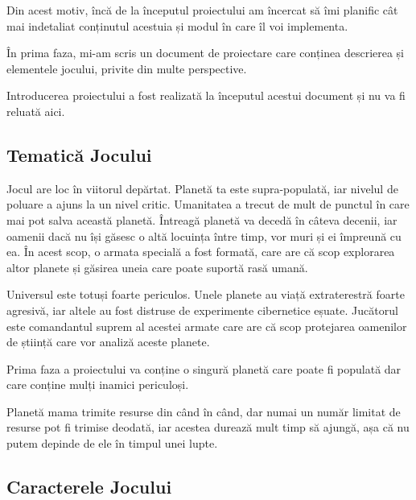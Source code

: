 \documentclass[12pt, a4paper]{article}
\begin{document}
	Din acest motiv, încă de la începutul proiectului am încercat să îmi planific cât mai indetaliat conținutul acestuia și modul în care îl voi implementa.
	\newline
	
	În prima faza, mi-am scris un document de proiectare care conținea descrierea și elementele jocului, privite din multe perspective.
	\newline
	
	Introducerea proiectului a fost realizată la începutul acestui document și nu va fi reluată aici.
	
	
	
	
	
	\subsection{Tematică Jocului}
	\label{section: gamePlot}
	
	Jocul are loc în viitorul depărtat. Planetă ta este supra-populată, iar nivelul de poluare a ajuns la un nivel critic. Umanitatea a trecut de mult de punctul în care mai pot salva această planetă. Întreagă planetă va decedă în câteva decenii, iar oamenii dacă nu își găsesc o altă locuința între timp, vor muri și ei împreună cu ea. În acest scop, o armata specială a fost formată, care are că scop explorarea altor planete și găsirea uneia care poate suportă rasă umană.
	\newline
	
	Universul este totuși foarte periculos. Unele planete au viață extraterestră foarte agresivă, iar altele au fost distruse de experimente cibernetice eșuate. Jucătorul este comandantul suprem al acestei armate care are că scop protejarea oamenilor de știință care vor analiză aceste planete.
	\newline
	
	Prima faza a proiectului va conține o singură planetă care poate fi populată dar care conține mulți inamici periculoși.
	\newline
	
	Planetă mama trimite resurse din când în când, dar numai un număr limitat de resurse pot fi trimise deodată, iar acestea durează mult timp să ajungă, așa că nu putem depinde de ele în timpul unei lupte.
	
	
	
	
	
	\subsection{Caracterele Jocului}
	
\end{document}
